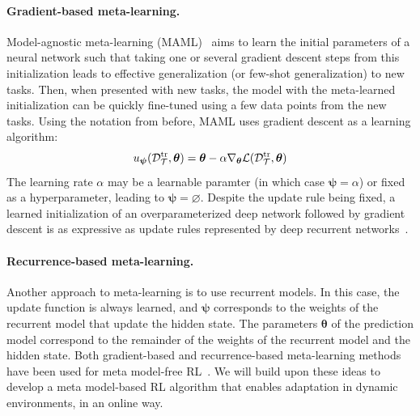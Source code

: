 \paragraph{Gradient-based meta-learning.} Model-agnostic meta-learning (MAML)~\citep{finn2017maml} aims to learn the initial parameters of a neural network such that taking one or several gradient descent steps from this initialization leads to effective generalization (or few-shot generalization) to new tasks. Then, when presented with new tasks, the model with the meta-learned initialization can be quickly fine-tuned using a few data points from the new tasks.
Using the notation from before, MAML uses gradient descent as a learning algorithm:
\begin{align}
    u_{\bm{\psi}}(\data_\mathcal{T}^\text{tr}, \bm{\theta}) = \bm{\theta} - \alpha \nabla_{\bm{\theta}} %
    \mathcal{L}(\data_\task^\text{tr}, {\bm \theta})
\end{align}
The learning rate $\alpha$ may be a learnable paramter (in which case $\bm{\psi}=\alpha$) or fixed as a hyperparameter, leading to $\bm{\psi}=\varnothing$. Despite the update rule being fixed, a learned initialization of an overparameterized deep network followed by gradient descent is  as expressive as update rules represented by deep recurrent networks~\citep{finn2017metauniv}.

\paragraph{Recurrence-based meta-learning.} Another approach to meta-learning is to use recurrent models. In this case, the update function is always learned, and $\bm{\psi}$ corresponds to the weights of the recurrent model that update the hidden state. The parameters $\bm{\theta}$ of the prediction model correspond to the remainder of the weights of the recurrent model and the hidden state. Both gradient-based and recurrence-based meta-learning methods have been used for meta model-free RL~\citep{finn2017maml,duan2016rl2}. We will build upon these ideas to develop a meta model-based RL algorithm that enables adaptation in dynamic environments, in an online way.
